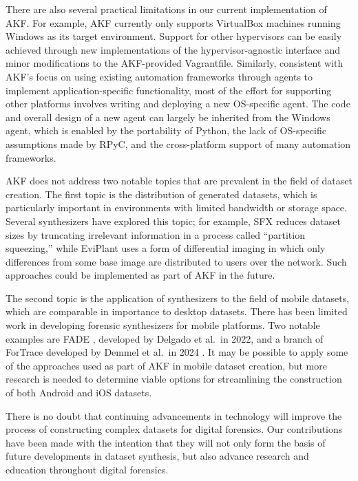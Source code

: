 \documentclass[final,5p,times,twocolumn]{elsarticle}
\begin{document}
There are also several practical limitations in our current
implementation of AKF. For example, AKF currently only supports
VirtualBox machines running Windows as its target environment. Support
for other hypervisors can be easily achieved through new implementations
of the hypervisor-agnostic interface and minor modifications to the
AKF-provided Vagrantfile. Similarly, consistent with AKF's focus on
using existing automation frameworks through agents to implement
application-specific functionality, most of the effort for supporting
other platforms involves writing and deploying a new OS-specific agent.
The code and overall design of a new agent can largely be inherited from
the Windows agent, which is enabled by the portability of Python, the
lack of OS-specific assumptions made by RPyC, and the cross-platform
support of many automation frameworks.

AKF does not address two notable topics that are prevalent in the field
of dataset creation. The first topic is the distribution of generated
datasets, which is particularly important in environments with limited
bandwidth or storage space. Several synthesizers have explored this
topic; for example, SFX \citep{russellForensicImageDescription2012}
reduces dataset sizes by truncating irrelevant information in a process
called ``partition squeezing,'' while EviPlant
\citep{scanlonEviPlantEfficientDigital2017} uses a form of
differential imaging in which only differences from some base image are
distributed to users over the network. Such approaches could be
implemented as part of AKF in the future.

The second topic is the application of synthesizers to the field of
mobile datasets, which are comparable in importance to desktop datasets.
There has been limited work in developing forensic synthesizers for
mobile platforms. Two notable examples are FADE
\citep{ceballosdelgadoFADEForensicImage2022}, developed by Delgado et
al.~in 2022, and a branch of ForTrace developed by Demmel et al.~in 2024
\citep{demmelDataSynthesisGoing2024}. It may be possible to apply
some of the approaches used as part of AKF in mobile dataset creation,
but more research is needed to determine viable options for streamlining
the construction of both Android and iOS datasets.

There is no doubt that continuing advancements in technology will
improve the process of constructing complex datasets for digital
forensics. Our contributions have been made with the intention that they
will not only form the basis of future developments in dataset
synthesis, but also advance research and education throughout digital
forensics.
\end{document}
